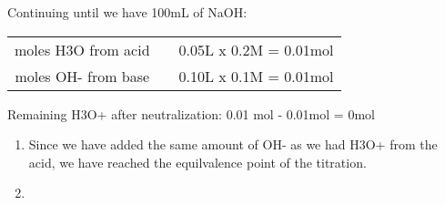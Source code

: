 \documentclass{article}  %
\begin{document}
Continuing until we have 100mL of NaOH:
\newline
\begin{tabular}{c@{}c@{}c@{}}
    moles H3O from acid && 0.05L x 0.2M = 0.01mol \\
    moles OH- from base && 0.10L x 0.1M = 0.01mol \\
\end{tabular}
\newline
Remaining H3O+ after neutralization: 0.01 mol - 0.01mol = 0mol \\
\begin{enumerate}
    \item Since we have added the same amount of OH- as we had H3O+ from the acid, we have reached the equilvalence point of the titration.
    \item 
\end{enumerate}
\end{document}
